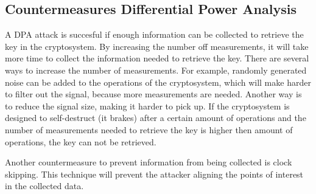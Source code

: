 \subsection{Countermeasures Differential Power Analysis}
A DPA attack is succesful if enough information can be collected to retrieve the key in the cryptosystem. By increasing the number off measurements, it will take more time to collect the information needed to retrieve the key. 
There are several ways to increase the number of measurements. For example, randomly generated noise can be added to the operations of the cryptosystem, which will make harder to filter out the signal, because more measurements are needed. Another way is to reduce the signal size, making it harder to pick up. 
If the cryptosystem is designed to self-destruct (it brakes) after a certain amount of operations and the number of measurements needed to retrieve the key is higher then amount of operations, the key can not be retrieved.

Another countermeasure to prevent information from being collected is clock skipping. This technique will prevent the attacker aligning the points of interest in the collected data. 


